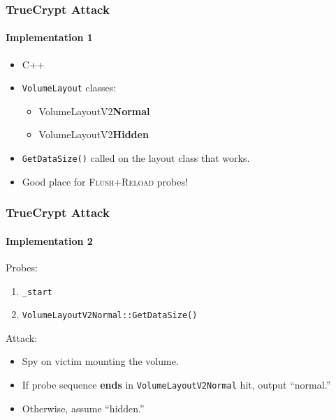 \documentclass{beamer}
\begin{document}
\begin{frame}
    \frametitle{TrueCrypt Attack}
    \framesubtitle{Implementation 1}

    \begin{itemize}
        \item C++
        \item \texttt{VolumeLayout} classes:
            \begin{itemize}
                \item VolumeLayoutV2\textbf{Normal}
                \item VolumeLayoutV2\textbf{Hidden}
            \end{itemize}
        \item \texttt{GetDataSize()} called on the layout class that works.
        \item Good place for \textsc{Flush+Reload} probes!
    \end{itemize}

\end{frame}

\begin{frame}
    \frametitle{TrueCrypt Attack}
    \framesubtitle{Implementation 2}

    Probes:

    \begin{enumerate}
        \item \texttt{\_start}
        \item \texttt{VolumeLayoutV2Normal::GetDataSize()}
    \end{enumerate}

    Attack:

    \begin{itemize}
        \item Spy on victim mounting the volume.
        \item If probe sequence \textbf{ends} in \texttt{VolumeLayoutV2Normal} hit, output ``normal.''
        \item Otherwise, assume ``hidden.''
    \end{itemize}

\end{frame}
\end{document}
